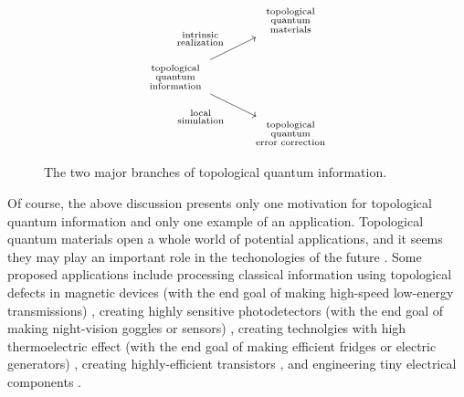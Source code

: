 \documentclass{article}
\theoremstyle{definition}
\newcommand{\0}{\left|0\right>}
\newcommand{\1}{\left|1\right>}
\numberwithin{figure}{section}
\begin{document}
\begin{figure}
\[\begin{tikzcd}
	& \begin{array}{c} \substack{\text{topological}\\ \text{quantum}\\\text{materials}} \end{array} \\
	\begin{array}{c} \substack{\text{topological} \\ \text{quantum} \\ \text{information}} \end{array} \\
	& \begin{array}{c} \substack{\text{topological}\\\text{quantum}\\ \text{error correction}} \end{array}
	\arrow["\begin{array}{c} \substack{\text{intrinsic}\\\text{realization}} \end{array}", from=2-1, to=1-2]
	\arrow["\begin{array}{c} \substack{\text{local}\\\text{simulation}} \end{array}"', from=2-1, to=3-2]
\end{tikzcd}\]
\caption{The two major branches of topological quantum information.}
\end{figure}

Of course, the above discussion presents only one motivation for topological quantum information and only one example of an application. Topological quantum materials open a whole world of potential applications, and it seems they may play an important role in the techonologies of the future \cite{ramirez2020dawn}. Some proposed applications include processing classical information using topological defects in magnetic devices (with the end goal of making high-speed low-energy transmissions) \cite{marrows2021perspective, vsmejkal2018topological}, creating highly sensitive photodetectors (with the end goal of making night-vision goggles or sensors) \cite{chan2017photocurrents}, creating technolgies with high thermoelectric effect (with the end goal of making efficient fridges or electric generators) \cite{skinner2018large}, creating highly-efficient transistors \cite{fuhrer2021proposal}, and engineering tiny electrical components \cite{viola2014hall, placke2017model}. 
\end{document}
